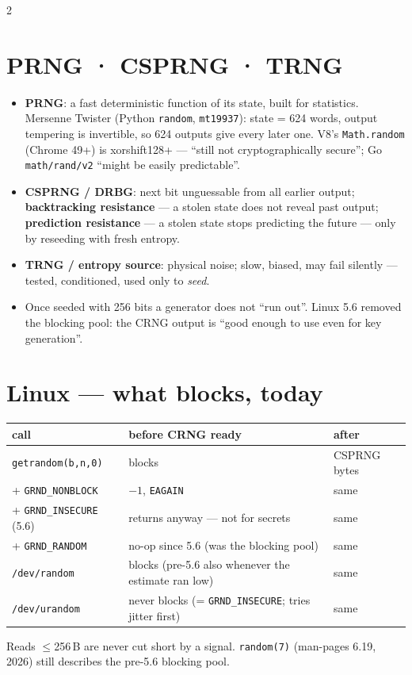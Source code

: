 \documentclass[8pt]{extarticle}
\newcommand\ct[1]{\texttt{#1}}
\begin{document}
\begin{multicols}{2}
\raggedright
\footnotesize{}

\section{PRNG · CSPRNG · TRNG}
\begin{itemize}
  \item \textbf{PRNG}: a fast deterministic function of its state, built for statistics. Mersenne
        Twister (Python \ct{random}, \ct{mt19937}): state = 624 words, output tempering is
        invertible, so 624 outputs give every later one. V8's \ct{Math.random} (Chrome 49+) is xorshift128+ —
        ``still not cryptographically secure''; Go \ct{math/rand/v2} ``might be easily predictable''.
  \item \textbf{CSPRNG / DRBG}: next bit unguessable from all earlier output; \textbf{backtracking
        resistance} — a stolen state does not reveal past output; \textbf{prediction resistance}
        — a stolen state stops predicting the future — only by reseeding with fresh entropy.
  \item \textbf{TRNG / entropy source}: physical noise; slow, biased, may fail silently — tested,
        conditioned, used only to \emph{seed}.
  \item Once seeded with 256 bits a generator does not ``run out''. Linux 5.6 removed the blocking
        pool: the CRNG output is ``good enough to use even for key generation''.
\end{itemize}

\section{Linux — what blocks, today}
{\scriptsize\setlength\tabcolsep{2.5pt}
\begin{tabular}{@{}>{\raggedright\arraybackslash}p{24mm}>{\raggedright\arraybackslash}p{33mm}>{\raggedright\arraybackslash}p{19mm}@{}}
\toprule
\textbf{call} & \textbf{before CRNG ready} & \textbf{after}\\ \midrule
\ct{getrandom(b,n,0)} & blocks & CSPRNG bytes\\
+ \ct{GRND\_NONBLOCK} & $-1$, \ct{EAGAIN} & same\\
+ \ct{GRND\_INSECURE} (5.6) & returns anyway — not for secrets & same\\
+ \ct{GRND\_RANDOM} & no-op since 5.6 (was the blocking pool) & same\\
\ct{/dev/random} & blocks (pre-5.6 also whenever the estimate ran low) & same\\
\ct{/dev/urandom} & never blocks (= \ct{GRND\_INSECURE}; tries jitter first) & same\\
\bottomrule
\end{tabular}}\par
Reads $\le$256\,B are never cut short by a signal. \ct{random(7)} (man-pages 6.19, 2026) still
describes the pre-5.6 blocking pool.


\end{multicols}
\end{document}
